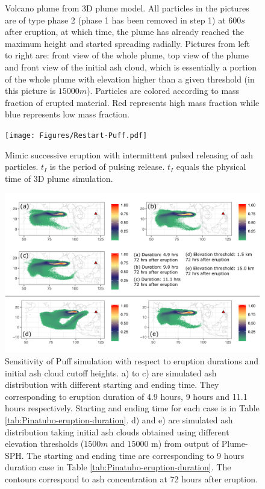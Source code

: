 \documentclass[utf8]{frontiersSCNS} %
\begin{document}
\begin{figure}[!htb]
\begin{minipage}{.325 \textwidth}
\end{minipage}%
\caption{Volcano plume from 3D plume model. All particles in the pictures are of type phase 2 (phase 1 has been removed in step 1) at $600s$ after eruption, at which time, the plume has already reached the maximum height and started spreading radially. Pictures from left to right are: front view of the whole plume, top view of the plume and front view of the initial ash cloud, which is essentially a portion of the whole plume with elevation higher than a given threshold (in this picture is $15000 m$). Particles are colored according to mass fraction of erupted material. Red represents high mass fraction while blue represents low mass fraction.}
\label{fig:Plume-SPH-Pinatubo-ash-cloud}
\end{figure}

\begin{figure}
\center
\texttt{[image: Figures/Restart-Puff.pdf]}
\caption{Mimic successive eruption with intermittent pulsed releasing of ash particles. $t_I$ is the period of pulsing release. $t_I$ equals the physical time of 3D plume simulation.}
\label{fig:Restart-Puff}
\end{figure}

\begin{figure}[!htb]
\centering
\includegraphics[width=0.99 \textwidth]{Figures/duration_cutoff}
\caption{Sensitivity of Puff simulation with respect to eruption durations and initial ash cloud cutoff heights. a) to c) are simulated ash distribution with different starting and ending time. They corresponding to eruption duration of 4.9 hours, 9 hours and 11.1 hours respectively. Starting and ending time for each case is in Table \ref{tab:Pinatubo-eruption-duration}. d) and e) are simulated ash distribution taking initial ash clouds obtained using different elevation thresholds ($1500 m$ and $15000$ m) from output of Plume-SPH. The starting and ending time are corresponding to 9 hours duration case in Table \ref{tab:Pinatubo-eruption-duration}. The contours correspond to ash concentration at 72 hours after eruption.}
\label{fig:Puff-sensitivity-duration-cutoff} 
\end{figure}
\end{document}

